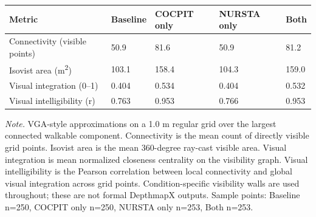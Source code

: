 \begin{tabular}{lllll}
\toprule
\textbf{Metric} & \textbf{Baseline} & \textbf{COCPIT only} & \textbf{NURSTA only} & \textbf{Both} \\
\midrule
Connectivity (visible points) & 50.9 & 81.6 & 50.9 & 81.2 \\
Isovist area (m\textsuperscript{2}) & 103.1 & 158.4 & 104.3 & 159.0 \\
Visual integration (0--1) & 0.404 & 0.534 & 0.404 & 0.532 \\
Visual intelligibility (r) & 0.763 & 0.953 & 0.766 & 0.953 \\
\bottomrule
\end{tabular}

\par\footnotesize\textit{Note.} VGA-style approximations on a 1.0 m regular grid over the largest connected walkable component. Connectivity is the mean count of directly visible grid points. Isovist area is the mean 360-degree ray-cast visible area. Visual integration is mean normalized closeness centrality on the visibility graph. Visual intelligibility is the Pearson correlation between local connectivity and global visual integration across grid points. Condition-specific visibility walls are used throughout; these are not formal DepthmapX outputs. Sample points: Baseline n=250, COCPIT only n=250, NURSTA only n=253, Both n=253.
